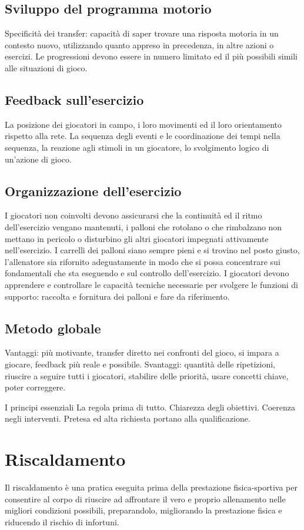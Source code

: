 \subsection{Sviluppo del programma motorio}
Specificità dei transfer: capacità di saper trovare una risposta motoria in un contesto nuovo, utilizzando quanto appreso in precedenza, in altre azioni o esercizi.
Le progressioni devono essere in numero limitato ed il più possibili simili alle situazioni di gioco.

\subsection{Feedback sull'esercizio}
La posizione dei giocatori in campo, i loro movimenti ed il loro orientamento rispetto alla rete.
La sequenza degli eventi e le coordinazione dei tempi nella sequenza, la reazione agli stimoli in un giocatore, lo svolgimento logico di un'azione di gioco.

\subsection{Organizzazione dell'esercizio}
I giocatori non coinvolti devono assicurarsi che la continuità ed il ritmo dell'esercizio vengano mantenuti, i palloni che rotolano o che rimbalzano non mettano in pericolo o disturbino gli altri giocatori impegnati attivamente nell'esercizio. I carrelli dei palloni siano sempre pieni e si trovino nel posto giusto, l'allenatore sia rifornito adeguatamente in modo che si possa concentrare sui fondamentali che sta eseguendo e sul controllo dell'esercizio.
I giocatori devono apprendere e controllare le capacità tecniche necessarie per svolgere le funzioni di supporto: raccolta e fornitura dei palloni e fare da riferimento.

\subsection{Metodo globale}
Vantaggi: più motivante, transfer diretto nei confronti del gioco, si impara a giocare, feedback più reale e possibile. 
Svantaggi: quantità delle ripetizioni, riuscire a seguire tutti i giocatori, stabilire delle priorità, usare concetti chiave, poter correggere.

I principi essenziali
La regola prima di tutto.
Chiarezza degli obiettivi.
Coerenza negli interventi.
Pretesa ed alta richiesta portano alla qualificazione.

\section{Riscaldamento}
Il riscaldamento è una pratica eseguita prima della prestazione fisica-sportiva per consentire al corpo di riuscire ad affrontare il vero e proprio allenamento nelle migliori condizioni possibili, preparandolo, migliorando la prestazione fisica e riducendo il rischio di infortuni.

